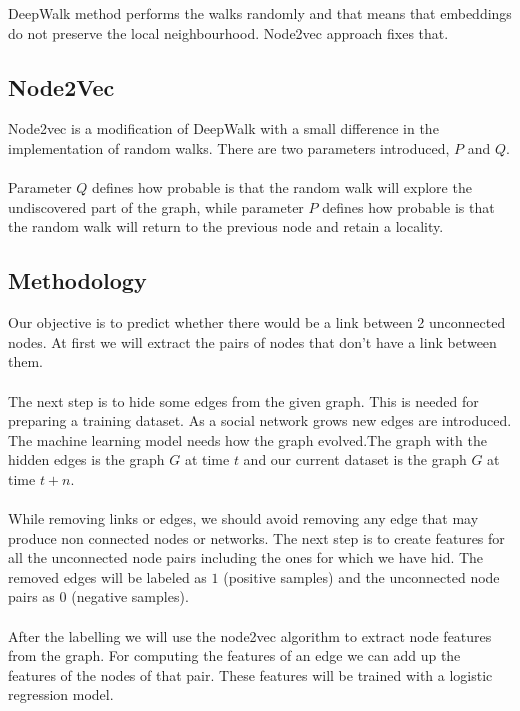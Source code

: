 \noindent  DeepWalk method performs the walks randomly and that means that embeddings do not preserve the local neighbourhood. Node2vec approach fixes that.

\subsection{Node2Vec}

Node2vec is a modification of DeepWalk with a small difference in  the implementation of random walks. There are two parameters introduced, $P$ and $Q$. 
\\
\\
Parameter $Q$ defines how probable is that the random walk will explore the undiscovered part of the graph, while parameter $P$ defines how probable is that the random walk will return to the previous node and retain a locality.

\subsection{Methodology}
\label{sec:methodology}

Our objective is to predict whether there would be a link between 2 unconnected nodes. At first we will extract the pairs of nodes that don't have a link between them.
\\
\\
The next step is to hide some edges from the given graph. This is needed for preparing a training dataset. As a social network grows new edges are introduced. The machine learning model needs how the graph evolved.The graph with the hidden edges is the graph $G$ at time $t$ and our current dataset is the graph $G$ at time $t+n$.
\\
\\
While removing links or edges, we should avoid removing any edge that may produce non connected nodes or networks. The next step is to create features for all the unconnected node pairs including the ones for which we have hid. The removed edges will be labeled as $1$ (positive samples) and the unconnected node pairs as $0$ (negative samples).
\\
\\
After the labelling we will use the node2vec algorithm to extract node features from the graph. For computing the features of an edge we can add up the features of the nodes of that pair. These features will be trained with a logistic regression model.

\clearpage



